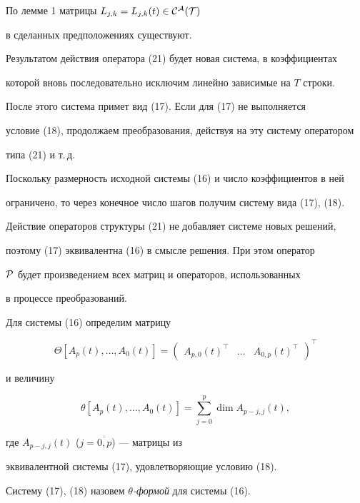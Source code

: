 \begin{pf}
По лемме 1 матрицы $L_{j,k}=L_{j,k}(t) \in \cal C^A(T)$ 


в сделанных предположениях существуют.


Результатом действия оператора (21) будет новая система, в коэффициентах


которой вновь последовательно исключим линейно зависимые на $T$ строки.


После этого система примет вид (17). Если для (17) не выполняется


условие (18), продолжаем преобразования, действуя на эту систему оператором


типа (21) и т.\,д.





Поскольку размерность исходной системы (16) и число коэффициентов в ней


ограничено, то через конечное число шагов получим систему вида (17), (18).





Действие операторов структуры (21) не добавляет системе новых решений,


поэтому (17) эквивалентна (16) в смысле решения. При этом оператор


$\cal P$ будет произведением всех матриц и операторов, использованных


в процессе преобразований.


\end{pf}





\begin{defn}


Для системы (16) определим матрицу


$$


\Theta[A_p(t), \dotsc, A_0(t)]=\begin{pmatrix}


{A_{p,0}(t)}^\top & \dotsc & {A_{0,p}(t)}^\top


\end{pmatrix}^\top


$$


и величину


$$


\theta [A_p(t), \dotsc, A_0(t)]= \sum_{j=0}^{p}{\dim A_{p-j,j}(t)},


$$


где $A_{p-j,j}(t)$ ($j=\overline{0,p}$) --- матрицы из


эквивалентной системы (17), удовлетворяющие условию (18).





Систему (17), (18) назовем {\it $\theta$-формой} для системы (16).


\end{defn}





